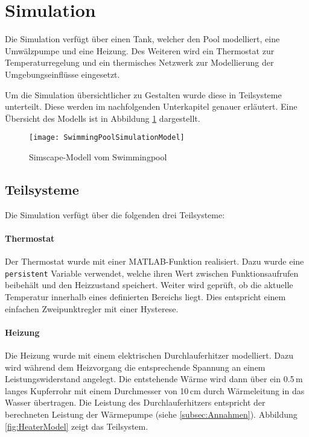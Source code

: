 \section{Simulation}
\label{sec:Simulation}
Die Simulation verfügt über einen Tank, welcher den Pool modelliert, eine Umwälzpumpe und eine Heizung. Des Weiteren wird ein Thermostat zur Temperaturregelung und ein thermisches Netzwerk zur Modellierung der Umgebungseinflüsse eingesetzt.

Um die Simulation übersichtlicher zu Gestalten wurde diese in Teilsysteme unterteilt. Diese werden im nachfolgenden Unterkapitel genauer erläutert. Eine Übersicht des Modells ist in Abbildung \ref{fig:SwimmingPoolSimulationModel} dargestellt.

\vspace{0.5cm}
\begin{figure}[H]
	\centering
	\texttt{[image: SwimmingPoolSimulationModel]}
	\caption{Simscape-Modell vom Swimmingpool}
	\label{fig:SwimmingPoolSimulationModel}
\end{figure}

\vspace{0.5cm}
\subsection{Teilsysteme}
\label{subsec:Teilsysteme}
Die Simulation verfügt über die folgenden drei Teilsysteme:

\vspace{0.5cm}
\paragraph{Thermostat}
Der Thermostat wurde mit einer MATLAB-Funktion realisiert. Dazu wurde eine \texttt{persistent} Variable verwendet, welche ihren Wert zwischen Funktionsaufrufen beibehält und den Heizzustand speichert. Weiter wird geprüft, ob die aktuelle Temperatur innerhalb eines definierten Bereichs liegt. Dies entspricht einem einfachen Zweipunktregler mit einer Hysterese.

\vspace{0.5cm}
\paragraph{Heizung}
Die Heizung wurde mit einem elektrischen Durchlauferhitzer modelliert. Dazu wird während dem Heizvorgang die entsprechende Spannung an einem Leistungswiderstand angelegt. Die entstehende Wärme wird dann über ein 0.5\,m langes Kupferrohr mit einem Durchmesser von 10\,cm durch Wärmeleitung in das Wasser übertragen. Die Leistung des Durchlauferhitzers entspricht der berechneten Leistung der Wärmepumpe (siehe \ref{subsec:Annahmen}). Abbildung \ref{fig:HeaterModel} zeigt das Teilsystem.


